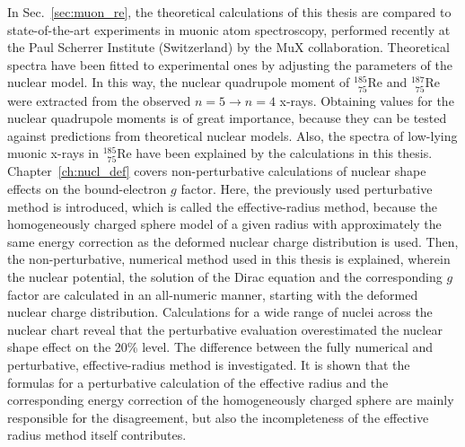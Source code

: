 In Sec.~\ref{sec:muon_re}, the theoretical calculations of this thesis are compared to state-of-the-art experiments in muonic atom spectroscopy, performed recently at the Paul Scherrer Institute (Switzerland) by the MuX collaboration. Theoretical spectra have been fitted to experimental ones by adjusting the parameters of the nuclear model. In this way, the nuclear quadrupole moment of $_{\phantom{1}75}^{185}$Re and $_{\phantom{1}75}^{187}$Re were extracted from the observed ${n}{=}{5}\rightarrow {n}{=}{4}$ x-rays. Obtaining values for the nuclear quadrupole moments is of great importance, because they can be tested against predictions from theoretical nuclear models. 
Also, the spectra of low-lying muonic x-rays in $_{\phantom{1}75}^{185}$Re have been explained by the calculations in this thesis.\\[11pt]%
%
Chapter~\ref{ch:nucl_def} covers non-perturbative calculations of nuclear shape effects on the bound-electron $g$ factor. Here, the previously used perturbative method is introduced, which is called the effective-radius method, because the homogeneously charged sphere model of a given radius with approximately the same energy correction as the deformed nuclear charge distribution is used. 
Then, the non-perturbative, numerical method used in this thesis is explained, wherein the nuclear potential, the solution of the Dirac equation and the corresponding $g$ factor are calculated in an all-numeric manner, starting with the deformed nuclear charge distribution. Calculations for a wide range of nuclei across the nuclear chart reveal that the perturbative evaluation overestimated the nuclear shape effect on the 20\% level. The difference between the fully numerical and perturbative, effective-radius method is investigated. It is shown that the formulas for a perturbative calculation of the effective radius and the corresponding energy correction of the homogeneously charged sphere are mainly responsible for the disagreement, but also the incompleteness of the effective radius method itself contributes.

